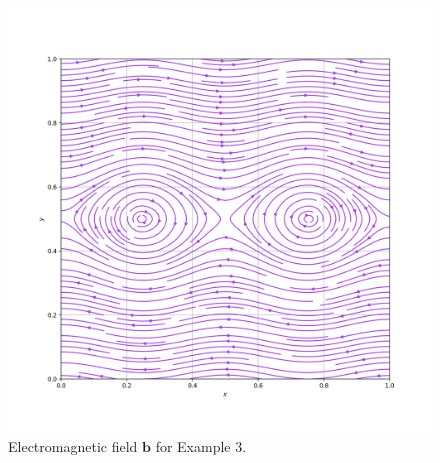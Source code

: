 \documentclass[12pt]{ociamthesis}
\begin{document}
\begin{figure}[H]
 \includegraphics[width=\textwidth]{Pics/VectorField/E3b.png}
  \caption{Electromagnetic field $\mathbf{b}$ for Example $3$.}
 \label{E3_VF}
\end{figure}
\end{document}
